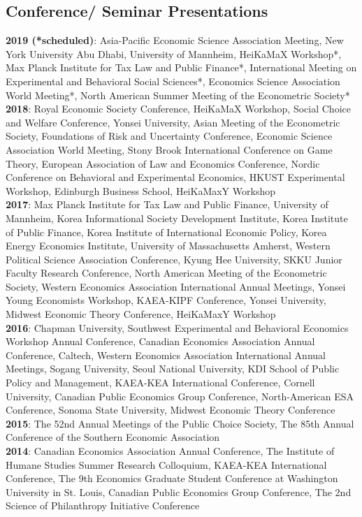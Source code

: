 \documentclass[margin, letterpaper]{res}
\begin{document}
\begin{resume}
\section{Conference/ Seminar Presentations}
\textbf{2019 (*scheduled)}: Asia-Pacific Economic Science Association Meeting, New York University Abu Dhabi, University of Mannheim, HeiKaMaX Workshop*, Max Planck Institute for Tax Law and Public Finance*, International Meeting on Experimental and Behavioral Social Sciences*, Economics Science Association World Meeting*, North American Summer Meeting of the Econometric Society*\\
\textbf{2018}: Royal Economic Society Conference, HeiKaMaX Workshop, Social Choice and Welfare Conference, Yonsei University, Asian Meeting of the Econometric Society, Foundations of Risk and Uncertainty Conference, Economic Science Association World Meeting, Stony Brook International Conference on Game Theory, European Association of Law and Economics Conference, Nordic Conference on Behavioral and Experimental Economics, HKUST Experimental Workshop, Edinburgh Business School, HeiKaMaxY Workshop\\
\textbf{2017}: Max Planck Institute for Tax Law and Public Finance, University of Mannheim, Korea Informational Society Development Institute, Korea Institute of Public Finance, Korea Institute of International Economic Policy, Korea Energy Economics Institute, University of Massachusetts Amherst, Western Political Science Association Conference, Kyung Hee University, SKKU Junior Faculty Research Conference, North American Meeting of the Econometric Society, Western Economics Association International Annual Meetings, Yonsei Young Economists Workshop, KAEA-KIPF Conference, Yonsei University, Midwest Economic Theory Conference, HeiKaMaxY Workshop\\
\textbf{2016}: Chapman University, Southwest Experimental and Behavioral Economics Workshop Annual Conference, Canadian Economics Association Annual Conference, Caltech, Western Economics Association International Annual Meetings, Sogang University, Seoul National University, KDI School of Public Policy and Management, KAEA-KEA International Conference, Cornell University, Canadian Public Economics Group Conference, North-American ESA Conference, Sonoma State University, Midwest Economic Theory Conference\\
\textbf{2015}: The 52nd Annual Meetings of the Public Choice Society, The 85th Annual Conference of the Southern Economic Association\\
\textbf{2014}: Canadian Economics Association Annual Conference, The Institute of Humane Studies Summer Research Colloquium, KAEA-KEA International Conference, The 9th Economics Graduate Student Conference at Washington University in St. Louis, Canadian Public Economics Group Conference, The 2nd Science of Philanthropy Initiative Conference


\end{resume}
\end{document}
